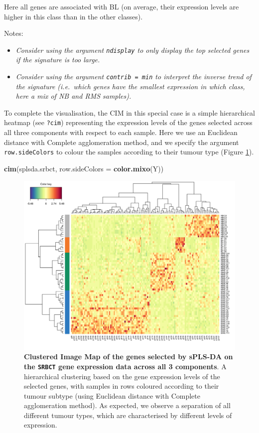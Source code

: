 \documentclass[]{book}
\newenvironment{Shaded}{\begin{snugshade}}{\end{snugshade}}
\newcommand{\DataTypeTok}[1]{\textcolor[rgb]{0.13,0.29,0.53}{#1}}
\newcommand{\KeywordTok}[1]{\textcolor[rgb]{0.13,0.29,0.53}{\textbf{#1}}}
\newcommand{\NormalTok}[1]{#1}
\providecommand{\tightlist}{%
  \setlength{\itemsep}{0pt}\setlength{\parskip}{0pt}}
\begin{document}
Here all genes are associated with BL (on average, their expression levels are higher in this class than in the other classes).

Notes:

\begin{itemize}
\tightlist
\item
  \emph{Consider using the argument \texttt{ndisplay} to only display the top selected genes if the signature is too large.}
\item
  \emph{Consider using the argument \texttt{contrib\ =\ \textquotesingle{}min\textquotesingle{}} to interpret the inverse trend of the signature (i.e.~which genes have the smallest expression in which class, here a mix of NB and RMS samples).}
\end{itemize}

To complete the visualisation, the CIM in this special case is a simple hierarchical heatmap (see \texttt{?cim}) representing the expression levels of the genes selected across all three components with respect to each sample. Here we use an Euclidean distance with Complete agglomeration method, and we specify the argument \texttt{row.sideColors} to colour the samples according to their tumour type (Figure \ref{fig:splsda-cim}).

\begin{Shaded}
\begin{Highlighting}[]
\KeywordTok{cim}\NormalTok{(splsda.srbct, }\DataTypeTok{row.sideColors =} \KeywordTok{color.mixo}\NormalTok{(Y))}
\end{Highlighting}
\end{Shaded}

\begin{figure}

{\centering \includegraphics[width=0.5\linewidth]{Figures/PLSDA/splsda-cim-1} 

}

\caption{\textbf{Clustered Image Map of the genes selected by sPLS-DA on the \texttt{SRBCT} gene expression data across all 3 components}. A hierarchical clustering based on the gene expression levels of the selected genes, with samples in rows coloured according to their tumour subtype (using Euclidean distance with Complete agglomeration method). As expected, we observe a separation of all different tumour types, which are characterised by different levels of expression.}\label{fig:splsda-cim}
\end{figure}
\end{document}
